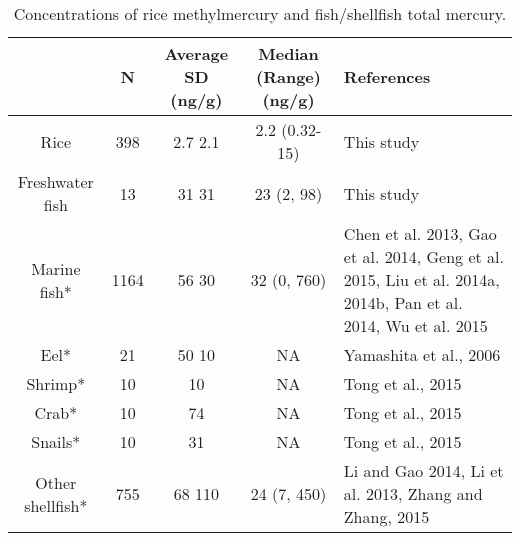 \begin{table}[htp]
\tiny
\caption[Concentrations of rice methylmercury and fish/shellfish total mercury]{Concentrations of rice methylmercury and fish/shellfish total mercury.}
\begin{center}
\begin{tabular}{|c|c|c|c|p{4cm}|}
\hline
 & N & Average  SD (ng/g) & Median (Range) (ng/g) & References  \\ \hline
Rice  & 398 & 2.7  2.1 & 2.2 (0.32-15) & This study  \\ \hline
Freshwater fish & 13 & 31  31 & 23 (2, 98) & This study  \\ \hline
Marine fish* & 1164 & 56  30 & 32 (0, 760) & Chen et al. 2013, Gao et al. 2014, Geng et al. 2015, Liu et al. 2014a, 2014b, Pan et al. 2014, Wu et al. 2015  \\ \hline
Eel* & 21 & 50  10 & NA & Yamashita et al., 2006  \\ \hline
Shrimp* & 10 & 10 & NA & Tong et al., 2015  \\ \hline
Crab* & 10 & 74 & NA & Tong et al., 2015  \\ \hline
Snails* & 10 & 31 & NA & Tong et al., 2015  \\ \hline
Other shellfish* & 755 & 68  110 & 24 (7, 450) & Li and Gao 2014, Li et al. 2013, Zhang and Zhang, 2015  \\ \hline
\end{tabular}
\end{center}
\label{default}
\end{table}